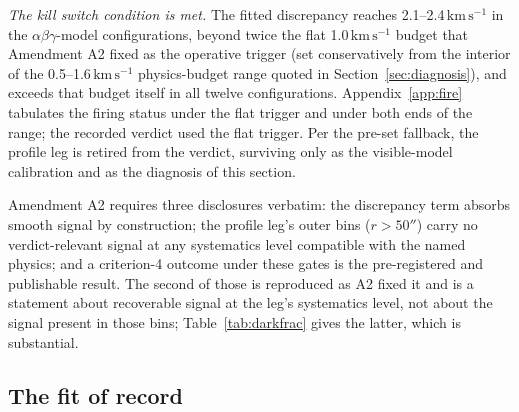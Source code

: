 \documentclass[11pt]{article}
\newcommand{\kms}{\ensuremath{\mathrm{km\,s^{-1}}}}
\begin{document}
\emph{The kill switch condition is met.} The fitted discrepancy reaches 2.1--2.4\,\kms{} in the $\alpha\beta\gamma$-model configurations, beyond twice the flat 1.0\,\kms{} budget that Amendment A2 fixed as the operative trigger (set conservatively from the interior of the 0.5--1.6\,\kms{} physics-budget range quoted in Section~\ref{sec:diagnosis}), and exceeds that budget itself in all twelve configurations. Appendix~\ref{app:fire} tabulates the firing status under the flat trigger and under both ends of the range; the recorded verdict used the flat trigger. Per the pre-set fallback, the profile leg is retired from the verdict, surviving only as the visible-model calibration and as the diagnosis of this section.

Amendment A2 requires three disclosures verbatim: the discrepancy term absorbs smooth signal by construction; the profile leg's outer bins ($r > 50''$) carry no verdict-relevant signal at any systematics level compatible with the named physics; and a criterion-4 outcome under these gates is the pre-registered and publishable result. The second of those is reproduced as A2 fixed it and is a statement about recoverable signal at the leg's systematics level, not about the signal present in those bins; Table~\ref{tab:darkfrac} gives the latter, which is substantial.

\subsection{The fit of record}
\label{sec:record}
\end{document}
